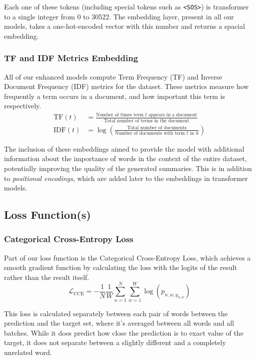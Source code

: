 Each one of these tokens (including special tokens such as \texttt{<SOS>}) is transformer to a single integer from 0 to \num{30522}.
The embedding layer, present in all our models, takes a one-hot-encoded vector with this number and returns a spacial embedding.

\subsubsection{TF and IDF Metrics Embedding}

All of our enhanced models compute Term Frequency (TF) and Inverse Document Frequency (IDF) metrics for the dataset\cite{nallapati2016abstractive}.
These metrics measure how frequently a term occurs in a document, and how important this term is respectively.
\begin{align}
	\text{TF}(t) &= \frac{\text{Number of times term $t$ appears in a document}}{\text{Total number of terms in the document}} \\[1ex]
	\text{IDF}(t) &= \log \left( \frac{\text{Total number of documents}}{\text{Number of documents with term $t$ in it}} \right)
\end{align}

The inclusion of these embeddings aimed to provide the model with additional information about the importance of words in the context of the entire dataset, potentially improving the quality of the generated summaries.
This is in addition to \emph{positional encodings}, which are added later to the embeddings in transformer models.

\subsection{Loss Function(s)}

\subsubsection{Categorical Cross-Entropy Loss}

Part of our loss function is the Categorical Cross-Entropy Loss\cite{cross_entropy_loss}, which achieves a smooth gradient function by calculating the loss with the logits of the result rather than the result itself.
\begin{equation}
	\mathcal{L}_\text{CCE} = - \frac{1}{N} \frac{1}{W} \sum_{n=1}^{N} \sum^W_{w = 1} \log(p_{n,w,y_{n,w}})
\end{equation}

This loss is calculated separately between each pair of words between the prediction and the target set, where it's averaged between all words and all batches.
While it does predict how close the prediction is to exact value of the target, it does not separate between a slightly different and a completely unrelated word.

